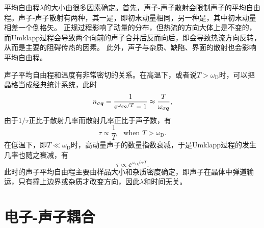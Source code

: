 平均自由程$\lambda$的大小由很多因素确定。首先，声子-声子散射会限制声子的平均自由程。声子-声子散射有两种，其一是，即初末动量相同，另一种是，其中初末动量相差一个倒格矢。
正规过程影响了动量的分布，但热流的方向大体上是不变的，而Umklapp过程会导致两个向前的声子合并后反而向后，即会导致热流方向反转，从而是主要的阻碍传热的因素。
此外，声子与杂质、缺陷、界面的散射也会影响平均自由程。

声子平均自由程和温度有非常密切的关系。在高温下，或者说$T > \omega_\text{D}$时，可以把晶格当成经典统计系统，此时
\begin{equation}
    n_{\sigma \vb*{q}} = \frac{1}{\mathrm{e}^{\omega_{\sigma \vb*{q}} / T} - 1} \approx \frac{T}{\omega_{\sigma \vb*{q}}},
\end{equation}
由于$1/ \tau$正比于散射几率而散射几率正比于声子数，有
\begin{equation}
    \tau \propto \frac{1}{T} \quad \text{when $T > \omega_\text{D}$}.
\end{equation}
在低温下，即$T \ll \omega_\text{D}$时，高动量声子的数量指数衰减，于是Umklapp过程的发生几率也随之衰减，有
\begin{equation}
    \tau \propto \ee^{\omega_\text{D} / \alpha T}.
\end{equation}
此时的声子平均自由程主要由样品大小和杂质密度确定，即声子在晶体中弹道输运，只有撞上边界或杂质才改变方向，因此$\lambda$和时间无关。

\section{电子-声子耦合}

